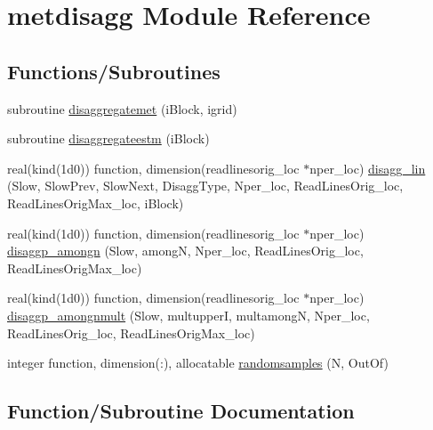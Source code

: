 \hypertarget{namespacemetdisagg}{}\section{metdisagg Module Reference}
\label{namespacemetdisagg}
\subsection*{Functions/\+Subroutines}
\begin{DoxyCompactItemize}
\item 
subroutine \hyperlink{namespacemetdisagg_a9b4db8548b33c73cf14f7280cb8de1b6}{disaggregatemet} (i\+Block, igrid)
\item 
subroutine \hyperlink{namespacemetdisagg_a67b638fd95044f06d411c6866ea8b2be}{disaggregateestm} (i\+Block)
\item 
real(kind(1d0)) function, dimension(readlinesorig\+\_\+loc $\ast$nper\+\_\+loc) \hyperlink{namespacemetdisagg_a8ad05f5320b2c1380934b4fbd591bbb9}{disagg\+\_\+lin} (Slow, Slow\+Prev, Slow\+Next, Disagg\+Type, Nper\+\_\+loc, Read\+Lines\+Orig\+\_\+loc, Read\+Lines\+Orig\+Max\+\_\+loc, i\+Block)
\item 
real(kind(1d0)) function, dimension(readlinesorig\+\_\+loc $\ast$nper\+\_\+loc) \hyperlink{namespacemetdisagg_a68fe3bfaf0b4ea325a7560e9c5ed518a}{disaggp\+\_\+amongn} (Slow, amongN, Nper\+\_\+loc, Read\+Lines\+Orig\+\_\+loc, Read\+Lines\+Orig\+Max\+\_\+loc)
\item 
real(kind(1d0)) function, dimension(readlinesorig\+\_\+loc $\ast$nper\+\_\+loc) \hyperlink{namespacemetdisagg_aba0eed0257bc8f0ce67fac76eae7375b}{disaggp\+\_\+amongnmult} (Slow, multupperI, multamongN, Nper\+\_\+loc, Read\+Lines\+Orig\+\_\+loc, Read\+Lines\+Orig\+Max\+\_\+loc)
\item 
integer function, dimension(\+:), allocatable \hyperlink{namespacemetdisagg_a23b40d11c1242cb3e4fc0dff94f960db}{randomsamples} (N, Out\+Of)
\end{DoxyCompactItemize}


\subsection{Function/\+Subroutine Documentation}
\mbox{\label{namespacemetdisagg_a8ad05f5320b2c1380934b4fbd591bbb9}} 
